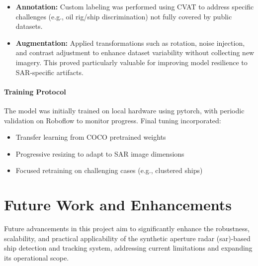 \documentclass{article}
\begin{document}
\begin{itemize}
    \item \textbf{Annotation:} Custom labeling was performed using CVAT to address specific challenges (e.g., oil rig/ship discrimination) not fully covered by public datasets. \item \textbf{Augmentation:} Applied transformations such as rotation, noise injection, and contrast adjustment to enhance dataset variability without collecting new imagery. This proved particularly valuable for improving model resilience to SAR-specific artifacts. \end{itemize}

\paragraph{Training Protocol}

The model was initially trained on local hardware using \acrshort{pytorch}, with periodic validation on Roboflow to monitor progress. Final tuning incorporated:

\begin{itemize}
    \item Transfer learning from COCO pretrained weights
    \item Progressive resizing to adapt to SAR image dimensions
    \item Focused retraining on challenging cases (e.g., clustered ships)
\end{itemize}





\newpage
\section{Future Work and Enhancements}
Future advancements in this project aim to significantly enhance the robustness, scalability, and practical applicability of the synthetic aperture radar (\acrshort{sar})-based ship detection and tracking system, addressing current limitations and expanding its operational scope.\\
\end{document}

